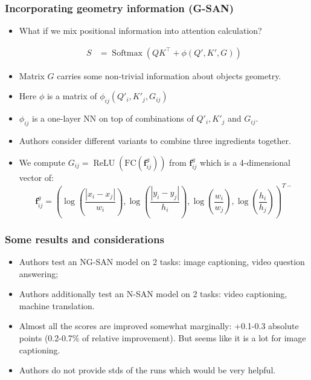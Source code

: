 \documentclass[handout, 10pt]{beamer}
\begin{document}
\begin{frame}
    \frametitle{Incorporating geometry information (G-SAN)}
    \begin{itemize}
        \item What if we mix positional information into attention calculation?

\begin{equation}
\begin{aligned}
S &=\operatorname{Softmax}\left(Q K^{\top} + \phi(Q', K', G) \right)
\end{aligned}
\end{equation}
    \item\pause Matrix $G$ carries some non-trivial information about objects geometry.
    \item\pause Here $\phi$ is a matrix of $\phi_{ij}(Q'_i, K'_j, G_{ij})$ 
    \item\pause $\phi_{ij}$ is a one-layer NN on top of combinations of $Q'_i, K'_j$ and $G_{ij}$.
    \item\pause Authors consider different variants to combine three ingredients together.
    \item\pause We compute $G_{i j}=\operatorname{ReLU}\left(\mathrm{FC}\left(\mathbf{f}_{i j}^{g}\right)\right)$ from $\mathbf{f}_{i j}^{g}$ which is a 4-dimensional vector of:
\begin{equation}
\mathbf{f}_{i j}^{g}=\left(\log \left(\frac{\left|x_{i}-x_{j}\right|}{w_{i}}\right), \log \left(\frac{\left|y_{i}-y_{j}\right|}{h_{i}}\right), \log \left(\frac{w_{i}}{w_{j}}\right), \log \left(\frac{h_{i}}{h_{j}}\right)\right)^{T-}
\end{equation}
    \end{itemize}
\end{frame}

\begin{frame}
    \frametitle{Some results and considerations}
    \begin{itemize}
        \item\pause Authors test an NG-SAN model on 2 tasks: image captioning, video question answering;
        \item\pause Authors additionally test an N-SAN model on 2 tasks: video captioning, machine translation.
        \item\pause Almost all the scores are improved somewhat marginally: +0.1-0.3 absolute points (0.2-0.7\% of relative improvement). But seems like it is a lot for image captioning.
        \item\pause Authors do not provide stds of the runs which would be very helpful.
    \end{itemize}
\end{frame}
\end{document}
